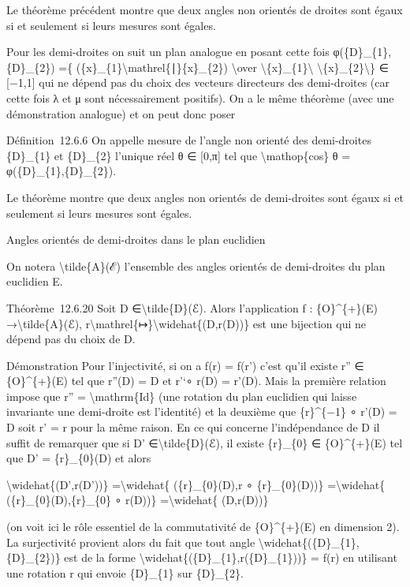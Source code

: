 \documentclass[]{article}
\begin{document}
Le théorème précédent montre que deux angles non orientés de droites
sont égaux si et seulement si leurs mesures sont égales.

Pour les demi-droites on suit un plan analogue en posant cette fois
φ(\{D\}\_\{1\},\{D\}\_\{2\}) =\{
(\{x\}\_\{1\}\textbackslash{}mathrel\{∣\}\{x\}\_\{2\})
\textbackslash{}over
\textbackslash{}\textbar{}\{x\}\_\{1\}\textbackslash{}\textbar{}
\textbackslash{}\textbar{}\{x\}\_\{2\}\textbackslash{}\textbar{}\} ∈
{[}−1,1{]} qui ne dépend pas du choix des vecteurs directeurs des
demi-droites (car cette fois λ et μ sont nécessairement positifs). On a
le même théorème (avec une démonstration analogue) et on peut donc poser

Définition~12.6.6 On appelle mesure de l'angle non orienté des
demi-droites \{D\}\_\{1\} et \{D\}\_\{2\} l'unique réel θ ∈ {[}0,π{]}
tel que \textbackslash{}mathop\{cos\} θ = φ(\{D\}\_\{1\},\{D\}\_\{2\}).

Le théorème montre que deux angles non orientés de demi-droites sont
égaux si et seulement si leurs mesures sont égales.

Angles orientés de demi-droites dans le plan euclidien

On notera \textbackslash{}tilde\{A\}(ℰ) l'ensemble des angles orientés
de demi-droites du plan euclidien E.

Théorème~12.6.20 Soit D ∈\textbackslash{}tilde\{D\}(ℰ). Alors
l'application f : \{O\}\^{}\{+\}(E) →\textbackslash{}tilde\{A\}(ℰ),
r\textbackslash{}mathrel\{↦\}\textbackslash{}widehat\{(D,r(D))\} est une
bijection qui ne dépend pas du choix de D.

Démonstration Pour l'injectivité, si on a f(r) = f(r') c'est qu'il
existe r'' ∈ \{O\}\^{}\{+\}(E) tel que r''(D) = D et r'`∘ r(D) = r'(D).
Mais la première relation impose que r'' = \textbackslash{}mathrm\{Id\}
(une rotation du plan euclidien qui laisse invariante une demi-droite
est l'identité) et la deuxième que \{r\}\^{}\{−1\} ∘ r'(D) = D soit r' =
r pour la même raison. En ce qui concerne l'indépendance de D il suffit
de remarquer que si D' ∈\textbackslash{}tilde\{D\}(ℰ), il existe
\{r\}\_\{0\} ∈ \{O\}\^{}\{+\}(E) tel que D' = \{r\}\_\{0\}(D) et alors

\textbackslash{}widehat\{(D',r(D'))\} =\textbackslash{}widehat\{
(\{r\}\_\{0\}(D),r ∘ \{r\}\_\{0\}(D))\} =\textbackslash{}widehat\{
(\{r\}\_\{0\}(D),\{r\}\_\{0\} ∘ r(D))\} =\textbackslash{}widehat\{
(D,r(D))\}

(on voit ici le rôle essentiel de la commutativité de \{O\}\^{}\{+\}(E)
en dimension 2). La surjectivité provient alors du fait que tout angle
\textbackslash{}widehat\{(\{D\}\_\{1\},\{D\}\_\{2\})\} est de la forme
\textbackslash{}widehat\{(\{D\}\_\{1\},r(\{D\}\_\{1\}))\} = f(r) en
utilisant une rotation r qui envoie \{D\}\_\{1\} sur \{D\}\_\{2\}.
\end{document}
